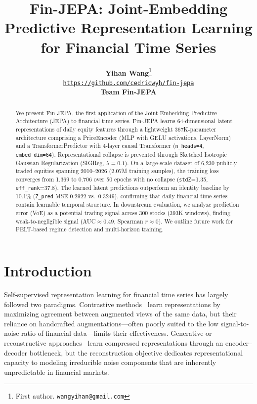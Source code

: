 \documentclass[11pt]{article}
\title{\textbf{Fin-JEPA: Joint-Embedding Predictive Representation Learning\\for Financial Time Series}}
\author{\textbf{Yihan Wang}\thanks{First author. \texttt{wangyihan@gmail.com}} \\[4pt]
  \texttt{\url{https://github.com/cedricwyh/fin-jepa}} \\[4pt]
  \textbf{Team Fin-JEPA}}
\date{}
\begin{document}
\maketitle

\begin{abstract}
We present Fin-JEPA, the first application of the Joint-Embedding Predictive Architecture (JEPA) to financial time series. Fin-JEPA learns 64-dimensional latent representations of daily equity features through a lightweight 367K-parameter architecture comprising a PriceEncoder (MLP with GELU activations, LayerNorm) and a TransformerPredictor with 4-layer causal Transformer (\texttt{n\_heads=4}, \texttt{embed\_dim=64}). Representational collapse is prevented through Sketched Isotropic Gaussian Regularization (SIGReg, $\lambda=0.1$). On a large-scale dataset of 6,230 publicly traded equities spanning 2010--2026 (2.07M training samples), the training loss converges from 1.369 to 0.706 over 50 epochs with no collapse (\texttt{stdZ}=1.35, \texttt{eff\_rank}=37.8). The learned latent predictions outperform an identity baseline by 10.1\% (\texttt{Z\_pred} MSE 0.2922 vs.\ 0.3249), confirming that daily financial time series contain learnable temporal structure. In downstream evaluation, we analyze prediction error (VoE) as a potential trading signal across 300 stocks (393K windows), finding weak-to-negligible signal (AUC$\approx$0.49, Spearman $r\approx$0). We outline future work for PELT-based regime detection and multi-horizon training.
\end{abstract}

\section{Introduction}

Self-supervised representation learning for financial time series has largely followed two paradigms. Contrastive methods~\citep{oord2018representation,chen2020simclr} learn representations by maximizing agreement between augmented views of the same data, but their reliance on handcrafted augmentations---often poorly suited to the low signal-to-noise ratio of financial data---limits their effectiveness. Generative or reconstructive approaches~\citep{kingma2014vae,hochreiter1997lstm} learn compressed representations through an encoder--decoder bottleneck, but the reconstruction objective dedicates representational capacity to modeling irreducible noise components that are inherently unpredictable in financial markets.
\end{document}
